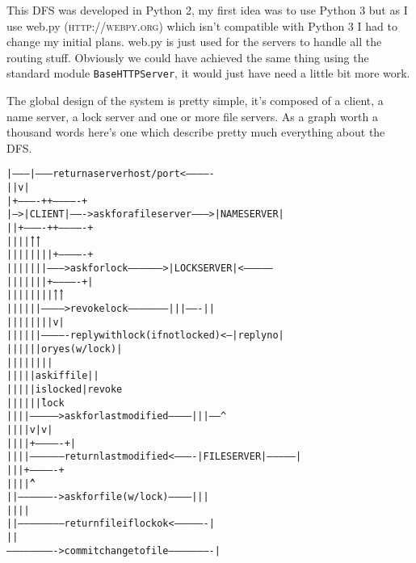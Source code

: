 \documentclass[12pt,a4paper]{report}
\begin{document}
		This DFS was developed in Python 2, my first idea was to use Python 3 but as I use web.py (\textsc{http://webpy.org}) which isn't compatible with Python 3 I had to change my initial plans. web.py is just used for the servers to handle all the routing stuff. Obviously we could have achieved the same thing using the standard module \texttt{BaseHTTPServer}, it would just have need a little bit more work.
		
		The global design of the system is pretty simple, it's composed of a client, a name server, a lock server and one or more file servers. As a graph worth a thousand words here's one which describe pretty much everything about the DFS.

	\begin{landscape}
	\begin{alltt}
|--------       |--------- return a server host/port <-------------
|       |       v                                                 |
|     +----------+                                         +-------------+
| --->|  CLIENT  |-------> ask for a file server --------> | NAME SERVER |
| |   +----------+                                         +-------------+
| |   | \^ | \^ | |
| |   | | | | | |                                          +-------------+
| |   | | | | | ---------> ask for lock -----------------> | LOCK SERVER |<--------------
| |   | | | | |                                            +-------------+              |
| |   | | | | |                                             \^ |   \^   |                 |
| |   | | | | -----------> revoke lock ---------------------| |   |   -------|          |
| |   | | | |                                                 |   |          v          |
| |   | | | |------------- reply with lock (if not locked) <---   |       reply no      |
| |   | | |                                                       |   or yes (w/ lock)  |
| |   | | |                                                       |          |          |
| |   | | |                                                   ask if file    |          |
| |   | | |                                                    is locked     |       revoke
| |   | | |                                                       \^          |        lock 
| |   | | ---------------> ask for last modified ------------|    |    |------          \^{}
| |   | |                                                    v    |    v                |
| |   | |                                                  +-------------+              |
| |   | |----------------- return last modified <----------| FILE SERVER |--------------|
| |   |                                                    +-------------+
| |   |                                                      \^    |    \^{}
| |   -------------------> ask for file (w/ lock) -----------|    |    |
| |                                                               |    |
| |----------------------- return file if lock ok <----------------    |
|                                                                      |
-------------------------> commit change to file ----------------------|
		\end{alltt}
		\end{landscape}
		
\end{document}
